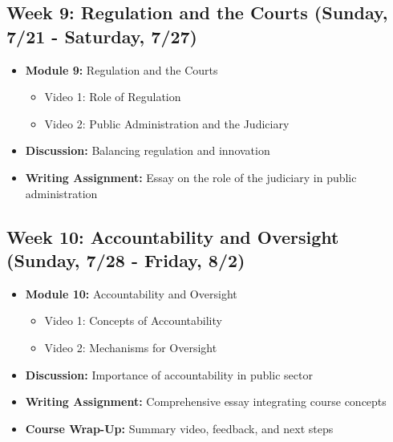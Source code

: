 \documentclass[12pt, letterpaper]{article}
\begin{document}
\subsection*{Week 9: Regulation and the Courts (Sunday, 7/21 - Saturday, 7/27)}
\begin{itemize}
    \item \textbf{Module 9:} Regulation and the Courts
    \begin{itemize}
        \item Video 1: Role of Regulation
        \item Video 2: Public Administration and the Judiciary
    \end{itemize}
    \item \textbf{Discussion:} Balancing regulation and innovation
    \item \textbf{Writing Assignment:} Essay on the role of the judiciary in public administration
\end{itemize}

\subsection*{Week 10: Accountability and Oversight (Sunday, 7/28 - Friday, 8/2)}
\begin{itemize}
    \item \textbf{Module 10:} Accountability and Oversight
    \begin{itemize}
        \item Video 1: Concepts of Accountability
        \item Video 2: Mechanisms for Oversight
    \end{itemize}
    \item \textbf{Discussion:} Importance of accountability in public sector
    \item \textbf{Writing Assignment:} Comprehensive essay integrating course concepts
    \item \textbf{Course Wrap-Up:} Summary video, feedback, and next steps
\end{itemize}
\end{document}
